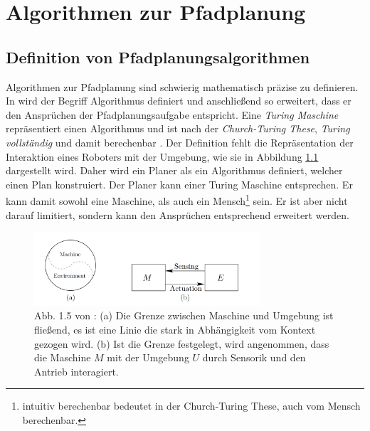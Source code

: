 

\chapter{Algorithmen zur Pfadplanung}
\section{Definition von Pfadplanungsalgorithmen}
 

Algorithmen zur Pfadplanung sind schwierig mathematisch präzise zu definieren.
In \cite[~S. 19]{Lav06} wird der Begriff Algorithmus definiert und anschließend so erweitert, dass er den Ansprüchen der Pfadplanungsaufgabe entspricht. 
Eine \textit{Turing Maschine} repräsentiert einen Algorithmus und ist nach der \textit{Church-Turing These}, \textit{Turing vollständig} und damit berechenbar \cite{Schmitz:19}. 
Der Definition fehlt die Repräsentation der Interaktion eines Roboters mit der Umgebung, wie sie in Abbildung \ref{lav01} dargestellt wird. 
Daher wird ein Planer als ein Algorithmus definiert, welcher einen Plan konstruiert. 
Der Planer kann einer Turing Maschine entsprechen. 
Er kann damit sowohl eine Maschine, als auch ein Mensch\footnote{intuitiv berechenbar bedeutet in der Church-Turing These, auch vom Mensch berechenbar.} sein.
Er ist aber nicht darauf limitiert, sondern kann den Ansprüchen entsprechend erweitert werden.\cite[~S. 20]{Lav06}

\begin{figure} %
	\centering
	\includegraphics[width=0.75\textwidth]{images/img224.png}
	\caption{Abb. 1.5 von \cite[~S. 20]{Lav06}:  (a) Die Grenze zwischen Maschine und Umgebung ist fließend, es ist eine Linie die stark in Abhängigkeit vom Kontext gezogen wird. (b) Ist die Grenze festgelegt, wird angenommen, dass die Maschine $M$ mit der Umgebung $U$ durch Sensorik und den Antrieb interagiert.}
	\label{lav01}
\end{figure}

